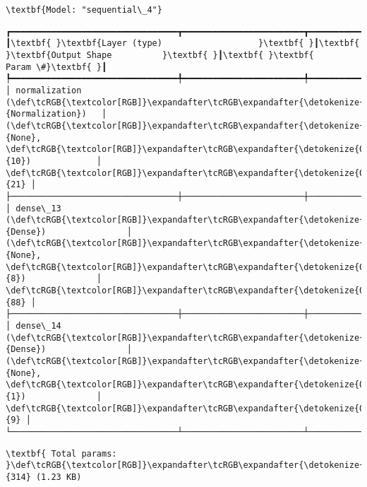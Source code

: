 \documentclass[11pt]{article}
\begin{document}
    
    \begin{Verbatim}[commandchars=\\\{\}]
\textbf{Model: "sequential\_4"}

    \end{Verbatim}

    
    
    \begin{Verbatim}[commandchars=\\\{\}]
┏━━━━━━━━━━━━━━━━━━━━━━━━━━━━━━━━━┳━━━━━━━━━━━━━━━━━━━━━━━━┳━━━━━━━━━━━━━━━┓
┃\textbf{ }\textbf{Layer (type)                   }\textbf{ }┃\textbf{ }\textbf{Output Shape          }\textbf{ }┃\textbf{ }\textbf{      Param \#}\textbf{ }┃
┡━━━━━━━━━━━━━━━━━━━━━━━━━━━━━━━━━╇━━━━━━━━━━━━━━━━━━━━━━━━╇━━━━━━━━━━━━━━━┩
│ normalization (\def\tcRGB{\textcolor[RGB]}\expandafter\tcRGB\expandafter{\detokenize{0,135,255}}{Normalization})   │ (\def\tcRGB{\textcolor[RGB]}\expandafter\tcRGB\expandafter{\detokenize{0,215,255}}{None}, \def\tcRGB{\textcolor[RGB]}\expandafter\tcRGB\expandafter{\detokenize{0,175,0}}{10})             │            \def\tcRGB{\textcolor[RGB]}\expandafter\tcRGB\expandafter{\detokenize{0,175,0}}{21} │
├─────────────────────────────────┼────────────────────────┼───────────────┤
│ dense\_13 (\def\tcRGB{\textcolor[RGB]}\expandafter\tcRGB\expandafter{\detokenize{0,135,255}}{Dense})                │ (\def\tcRGB{\textcolor[RGB]}\expandafter\tcRGB\expandafter{\detokenize{0,215,255}}{None}, \def\tcRGB{\textcolor[RGB]}\expandafter\tcRGB\expandafter{\detokenize{0,175,0}}{8})              │            \def\tcRGB{\textcolor[RGB]}\expandafter\tcRGB\expandafter{\detokenize{0,175,0}}{88} │
├─────────────────────────────────┼────────────────────────┼───────────────┤
│ dense\_14 (\def\tcRGB{\textcolor[RGB]}\expandafter\tcRGB\expandafter{\detokenize{0,135,255}}{Dense})                │ (\def\tcRGB{\textcolor[RGB]}\expandafter\tcRGB\expandafter{\detokenize{0,215,255}}{None}, \def\tcRGB{\textcolor[RGB]}\expandafter\tcRGB\expandafter{\detokenize{0,175,0}}{1})              │             \def\tcRGB{\textcolor[RGB]}\expandafter\tcRGB\expandafter{\detokenize{0,175,0}}{9} │
└─────────────────────────────────┴────────────────────────┴───────────────┘

    \end{Verbatim}

    
    
    \begin{Verbatim}[commandchars=\\\{\}]
\textbf{ Total params: }\def\tcRGB{\textcolor[RGB]}\expandafter\tcRGB\expandafter{\detokenize{0,175,0}}{314} (1.23 KB)

    \end{Verbatim}
\end{document}
